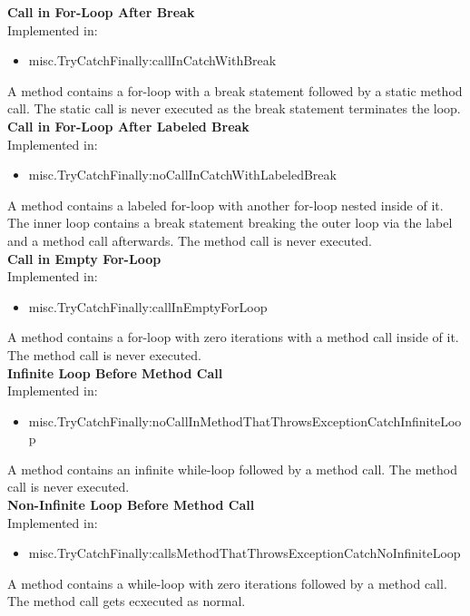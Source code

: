 \documentclass{article}
\begin{document}
\textbf{Call in For-Loop After Break}\\
Implemented in: 
\begin{itemize}
    \item misc.TryCatchFinally:callInCatchWithBreak
\end{itemize}
A method contains a for-loop with a break statement followed by a static method call. The static call is never executed as the break statement terminates the loop.\\

\noindent
\textbf{Call in For-Loop After Labeled Break}\\
Implemented in: 
\begin{itemize}
    \item misc.TryCatchFinally:noCallInCatchWithLabeledBreak
\end{itemize}
A method contains a labeled for-loop with another for-loop nested inside of it. The inner loop contains a break statement breaking the outer loop via the label and a method call afterwards. The method call is never executed.\\

\noindent
\textbf{Call in Empty For-Loop}\\
Implemented in: 
\begin{itemize}
    \item misc.TryCatchFinally:callInEmptyForLoop
\end{itemize}
A method contains a for-loop with zero iterations with a method call inside of it. The method call is never executed.\\

\noindent
\textbf{Infinite Loop Before Method Call}\\
Implemented in: 
\begin{itemize}
    \item misc.TryCatchFinally:noCallInMethodThatThrowsExceptionCatchInfiniteLoop
\end{itemize}
A method contains an infinite while-loop followed by a method call. The method call is never executed.\\

\noindent
\textbf{Non-Infinite Loop Before Method Call}\\
Implemented in: 
\begin{itemize}
    \item misc.TryCatchFinally:callsMethodThatThrowsExceptionCatchNoInfiniteLoop
\end{itemize}
A method contains a while-loop with zero iterations followed by a method call. The method call gets ecxecuted as normal.\\
\end{document}

